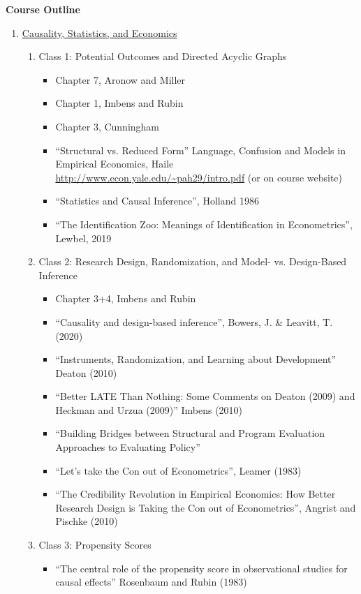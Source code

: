 \documentclass[11pt, a4paper]{article}
\begin{document}
\textbf{Course Outline}
\begin{enumerate}
\item \underline{Causality, Statistics, and Economics}
  \begin{enumerate}
  \item Class 1: Potential Outcomes and Directed Acyclic Graphs
    \begin{itemize}
    \item Chapter 7, Aronow and Miller
    \item Chapter 1, Imbens and Rubin
    \item Chapter 3, Cunningham
    \item ``Structural vs. Reduced Form'' Language, Confusion and Models in Empirical Economics, Haile \url{http://www.econ.yale.edu/~pah29/intro.pdf} (or on course website)
    \item ``Statistics and Causal Inference'', Holland 1986
    \item ``The Identification Zoo: Meanings of Identification in Econometrics'', Lewbel, 2019
    \end{itemize}
  \item Class 2: Research Design, Randomization, and Model- vs. Design-Based Inference
    \begin{itemize}
    \item Chapter 3+4, Imbens and Rubin      
    \item ``Causality and design-based inference'', Bowers, J. \& Leavitt, T. (2020)
    \item ``Instruments, Randomization, and
      Learning about Development'' Deaton (2010)
    \item ``Better LATE Than Nothing: Some Comments on Deaton (2009) and Heckman and Urzua (2009)'' Imbens (2010)
    \item ``Building Bridges between Structural and Program Evaluation Approaches to Evaluating Policy''
    \item ``Let's take the Con out of Econometrics'', Leamer (1983)
    \item ``The Credibility Revolution in Empirical Economics: How Better Research Design is Taking the Con out of Econometrics'', Angrist and Pischke (2010)
    \end{itemize}
  \item Class 3: Propensity Scores
    \begin{itemize}
    \item ``The central role of the propensity score in observational
      studies for causal effects'' Rosenbaum and Rubin (1983)

\end{itemize}
\end{enumerate}
\end{enumerate}
\end{document}
